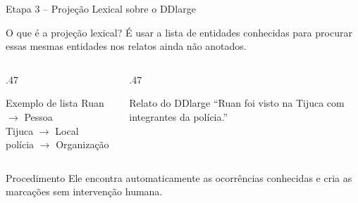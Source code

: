 \documentclass[aspectratio=169, 9pt]{beamer}
\begin{document}
\begin{frame}{Etapa 3 -- Projeção Lexical sobre o DDlarge}
  \begin{block}{O que é a projeção lexical?}
    É usar a lista de entidades conhecidas para procurar essas mesmas entidades nos relatos ainda não anotados.
  \end{block}

  \vspace{8pt}
  \begin{columns}[T]
    \begin{column}{.47\textwidth}
      \begin{exampleblock}{Exemplo de lista}
        \footnotesize
        Ruan $\rightarrow$ Pessoa\\
        Tijuca $\rightarrow$ Local\\
        polícia $\rightarrow$ Organização
      \end{exampleblock}
    \end{column}

    \begin{column}{.47\textwidth}
      \begin{exampleblock}{Relato do DDlarge}
        \footnotesize
        ``Ruan foi visto na Tijuca com integrantes da polícia.''
      \end{exampleblock}
    \end{column}
  \end{columns}

  \vspace{8pt}
  \begin{alertblock}{Procedimento}
    Ele encontra automaticamente as ocorrências conhecidas e cria as marcações sem intervenção humana.
  \end{alertblock}
\end{frame}
\end{document}
